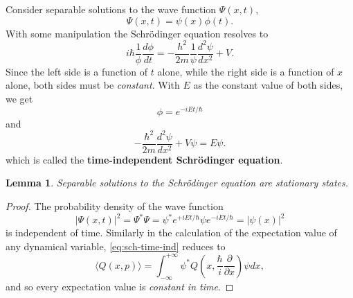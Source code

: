 \documentclass{article}
\newtheorem{lemma}{Lemma}
\begin{document}
Consider separable solutions to the wave function $\Psi(x, t)$,
\begin{equation} \label{eq:sch-time-ind-1}
  \Psi(x, t) = \psi(x)\phi(t).
\end{equation}
With some manipulation the Schr\"{o}dinger equation resolves to \[
  i\hbar \frac{1}{\phi} \frac{d\phi}{dt}
  = -\frac{h^2}{2m} \frac{1}{\psi} \frac{d^2\psi}{dx^2} + V.
\] Since the left side is a function of $t$ alone, while the right side is a
function of $x$ alone, both sides must be \emph{constant}. With $E$ as the
constant value of both sides, we get
\begin{equation} \label{eq:sch-time-ind-psi}
  \boxed{
    \phi = e^{-iEt/\hbar}
  }
\end{equation}
and
\begin{equation} \label{eq:sch-time-ind}
  \boxed{
    -\frac{\hbar^2}{2m} \frac{d^2\psi}{dx^2} + V\psi = E\psi.
  }
\end{equation}
which is called the \textbf{time-independent Schr\"{o}dinger equation}.

\begin{lemma}
  Separable solutions to the Schr\"{o}dinger equation are \emph{stationary
  states}.
\end{lemma}
\begin{proof}
  The probability density of the wave function \[
    |\Psi(x, t)|^2 = \Psi^*\Psi = \psi^* e^{+iEt/\hbar} \psi e^{-iEt/\hbar} =
    |\psi(x)|^2
  \] is independent of time. Similarly in the calculation of the expectation
  value of any dynamical variable, \eqref{eq:sch-time-ind} reduces to \[
    \langle Q(x, p) \rangle
    = \int_{-\infty}^{+\infty} \psi^*
      Q\left(x, \frac{\hbar}{i}\frac{\partial}{\partial x}\right)
    \psi dx,
  \] and so every expectation value is \emph{constant in time}.
\end{proof}
\end{document}
